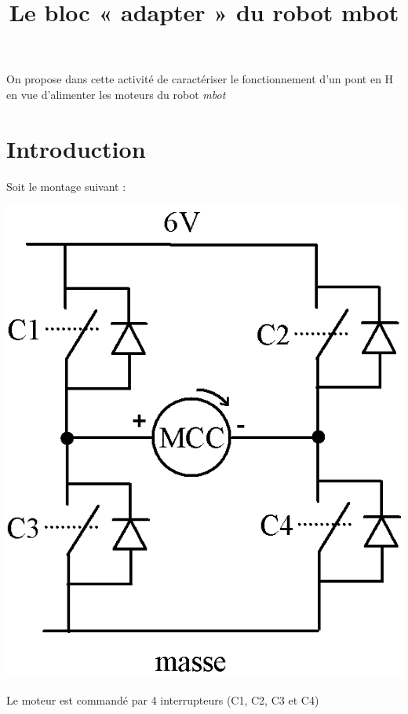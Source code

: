 \documentclass[10pt,fleqn]{article} %
\title{Le bloc « adapter » du robot mbot}
\date{}
\begin{document}
\maketitle
\chapterimage{}
%
\begin{obj}
  On propose dans cette activité de caractériser le fonctionnement d'un pont en H en vue d'alimenter les moteurs du robot \textit{mbot}
\end{obj}
\section{Introduction}
Soit le montage suivant :
  \begin{center}
    \includegraphics[height=.25\textheight]{images/pontH}
  \end{center}
  Le moteur est commandé par 4 interrupteurs (C1, C2, C3 et C4)
\end{document}
